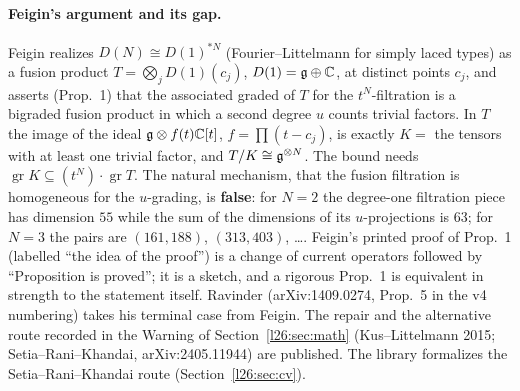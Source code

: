 \paragraph{Feigin's argument and its gap.} Feigin realizes $D(N)\cong D(1)^{*N}$ (Fourier--Littelmann for simply laced types) as a fusion product
$T=\bigotimes_jD(1)(c_j)$, $D(1)=\mathfrak g\oplus{\mathbb{C}}$, at distinct points $c_j$, and asserts (Prop.~1) that the associated
graded of $T$ for the $t^N$-filtration is a bigraded fusion product in which a second degree $u$ counts trivial factors.
In $T$ the image of the ideal $\mathfrak g\otimes f(t){\mathbb{C}}[t]$, $f=\prod(t-c_j)$, is exactly $K=$ the tensors with at least one
trivial factor, and $T/K\cong\mathfrak g^{\otimes N}$. The bound needs $\operatorname{gr}K\subseteq(t^N)\cdot\operatorname{gr}T$. The
natural mechanism, that the fusion filtration is homogeneous for the $u$-grading, is \textbf{false}: for $N=2$ the degree-one
filtration piece has dimension $55$ while the sum of the dimensions of its $u$-projections is $63$; for $N=3$ the pairs are
$(161,188)$, $(313,403)$, \dots. Feigin's printed proof of Prop.~1 (labelled ``the idea of the proof'') is a change of current
operators followed by ``Proposition is proved''; it is a sketch, and a rigorous Prop.~1 is equivalent in strength to the statement itself.
Ravinder (arXiv:1409.0274, Prop.~5 in the v4 numbering) takes his terminal case from Feigin. The repair and the alternative route recorded in
the Warning of Section~\ref{l26:sec:math} (Kus--Littelmann 2015; Setia--Rani--Khandai, arXiv:2405.11944) are published. The library formalizes the Setia--Rani--Khandai route (Section~\ref{l26:sec:cv}).


